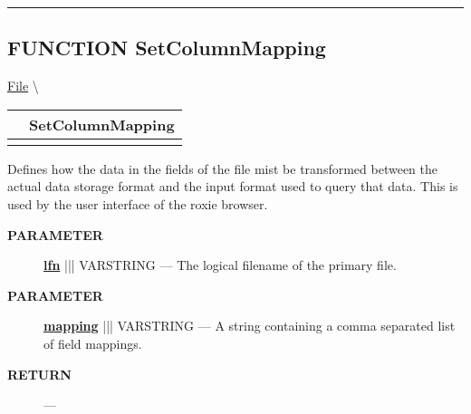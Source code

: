 \rule{\linewidth}{0.5pt}
\subsection*{\textsf{\colorbox{headtoc}{\color{white} FUNCTION}
SetColumnMapping}}

\hypertarget{ecldoc:file.setcolumnmapping}{}
\hspace{0pt} \hyperlink{ecldoc:File}{File} \textbackslash 

{\renewcommand{\arraystretch}{1.5}
\begin{tabularx}{\textwidth}{|>{\raggedright\arraybackslash}l|X|}
\hline
\hspace{0pt}\mytexttt{\color{red} } & \textbf{SetColumnMapping} \\
\hline
\multicolumn{2}{|>{\raggedright\arraybackslash}X|}{\hspace{0pt}\mytexttt{\color{param} (varstring lfn, varstring mapping)}} \\
\hline
\end{tabularx}
}

\par





Defines how the data in the fields of the file mist be transformed between the actual data storage format and the input format used to query that data. This is used by the user interface of the roxie browser.






\par
\begin{description}
\item [\colorbox{tagtype}{\color{white} \textbf{\textsf{PARAMETER}}}] \textbf{\underline{lfn}} ||| VARSTRING --- The logical filename of the primary file.
\item [\colorbox{tagtype}{\color{white} \textbf{\textsf{PARAMETER}}}] \textbf{\underline{mapping}} ||| VARSTRING --- A string containing a comma separated list of field mappings.
\end{description}







\par
\begin{description}
\item [\colorbox{tagtype}{\color{white} \textbf{\textsf{RETURN}}}] \textbf{} --- 
\end{description}





